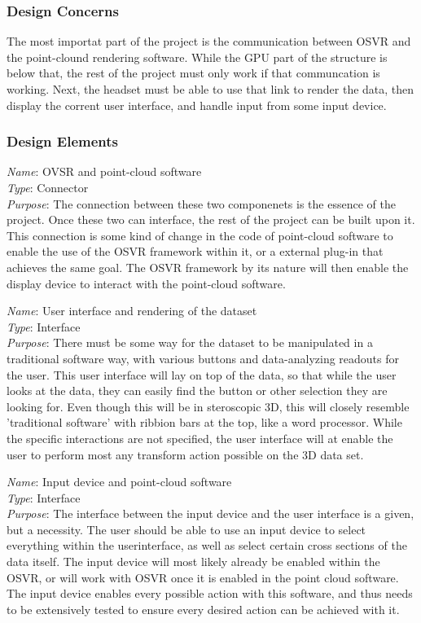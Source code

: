 \documentclass{article}
\begin{document}
\subsubsection{Design Concerns}
The most importat part of the project is the communication between OSVR and the point-clound rendering software.
While the GPU part of the structure is below that, the rest of the project must only work if that communcation is working.
Next, the headset must be able to use that link to render the data, then display the corrent user interface, and handle
input from some input device.

\subsubsection{Design Elements}

\textit{Name}: OVSR and point-cloud software\\
\textit{Type}: Connector\\
\textit{Purpose}: The connection between these two componenets is the essence of the project. Once these two can interface,
the rest of the project can be built upon it. This connection is some kind of change in the code of point-cloud software
to enable the use of the OSVR framework within it, or a external plug-in that achieves the same goal. The OSVR framework
by its nature will then enable the display device to interact with the point-cloud software.\\
\newline

\textit{Name}: User interface and rendering of the dataset\\
\textit{Type}: Interface\\
\textit{Purpose}: There must be some way for the dataset to be manipulated in a traditional software way, with various
buttons and data-analyzing readouts for the user. This user interface will lay on top of the data, so that while the user
looks at the data, they can easily find the button or other selection they are looking for. Even though this will be in
steroscopic 3D, this will closely resemble 'traditional software' with ribbion bars at the top, like a word processor.
While the specific interactions are not specified, the user interface will at enable the user to perform most any transform
action possible on the 3D data set.\\
\newline

\textit{Name}: Input device and point-cloud software\\
\textit{Type}: Interface\\
\textit{Purpose}: The interface between the input device and the user interface is a given, but a necessity. The user should
be able to use an input device to select everything within the userinterface, as well as select certain cross sections of the
data itself. The input device will most likely already be enabled within the OSVR, or will work with OSVR once it is enabled
in the point cloud software. The input device enables every possible action with this software, and thus needs to be extensively
tested to ensure every desired action can be achieved with it.
\end{document}
